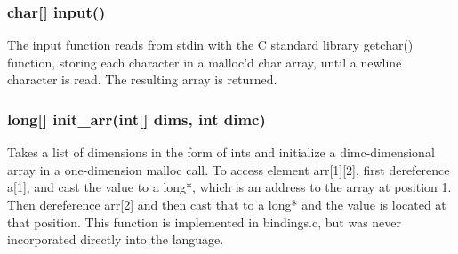 \begin{homeworkProblem}
	\subsubsection{char[] input()}
	The input function reads from stdin with the C standard library getchar() function, storing each character in a malloc'd char array, until a newline character is read. The resulting array is returned.
	\subsubsection{long[] init\_arr(int[] dims, int dimc)}
	Takes a list of dimensions in the form of ints and initialize a dimc-dimensional array in a one-dimension malloc call. To access element arr[1][2], first dereference a[1], and cast the value to a long*, which is an address to the array at position 1. Then dereference arr[2] and then cast that to a long* and the value is located at that position. This function is implemented in bindings.c, but was never incorporated directly into the language. 
\end{homeworkProblem}
